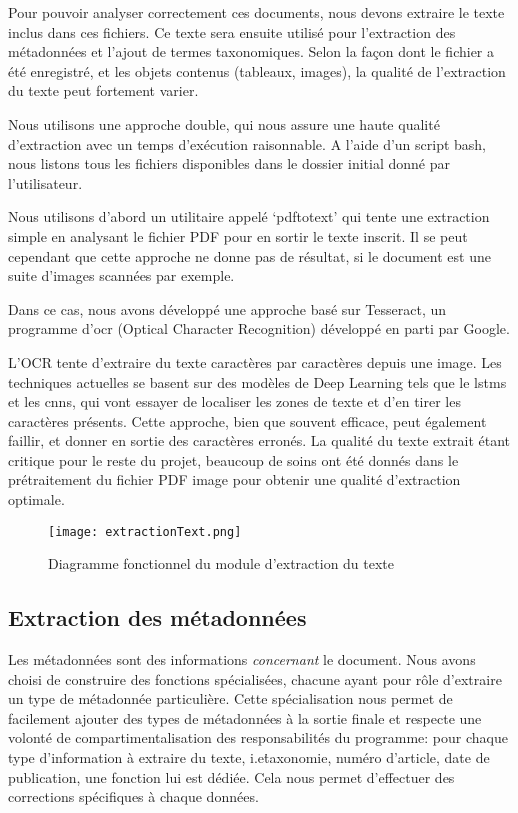 Pour pouvoir analyser correctement ces documents, nous devons extraire le texte inclus dans ces fichiers.
Ce texte sera ensuite utilisé pour l'extraction des métadonnées et l'ajout de termes taxonomiques.
Selon la façon dont le fichier a été enregistré, et les objets contenus (tableaux, images), la qualité de l'extraction du texte peut fortement varier. 

Nous utilisons une approche double, qui nous assure une haute qualité d'extraction avec un temps d'exécution raisonnable.
A l'aide d'un script bash, nous listons tous les fichiers disponibles dans le dossier initial donné par l'utilisateur. 

Nous utilisons d'abord un utilitaire appelé `pdftotext' qui tente une extraction simple en analysant le fichier PDF pour en sortir le texte inscrit.
Il se peut cependant que cette approche ne donne pas de résultat, si le document est une suite d'images scannées par exemple.

Dans ce cas, nous avons développé une approche basé sur Tesseract\cite{tess}, un programme d'\gls{ocr} (Optical Character Recognition) développé en parti par Google. 

L'OCR tente d'extraire du texte caractères par caractères depuis une image.
Les techniques actuelles se basent sur des modèles de Deep Learning tels que le \glspl{lstm} et les \glspl{cnn}, qui vont essayer de localiser les zones de texte et d'en tirer les caractères présents.
Cette approche, bien que souvent efficace, peut également faillir, et donner en sortie des caractères erronés.
La qualité du texte extrait étant critique pour le reste du projet, beaucoup de soins ont été donnés dans le prétraitement du fichier PDF image pour obtenir une qualité d'extraction optimale.

\begin{figure}[h!]
  \centering
	\texttt{[image: extractionText.png]}
	\caption[]{Diagramme fonctionnel du module d'extraction du texte}
  \label{}
\end{figure}


\subsection{Extraction des métadonnées}
Les métadonnées sont des informations \textit{concernant} le document.
Nous avons choisi de construire des fonctions spécialisées, chacune ayant pour rôle d'extraire un type de métadonnée particulière.
Cette spécialisation nous permet de facilement ajouter des types de métadonnées à la sortie finale et respecte une volonté de compartimentalisation des responsabilités du programme: pour chaque type d'information à extraire du texte, i.e\. taxonomie, numéro d'article, date de publication, une fonction lui est dédiée. 
Cela nous permet d'effectuer des corrections spécifiques à chaque données.

